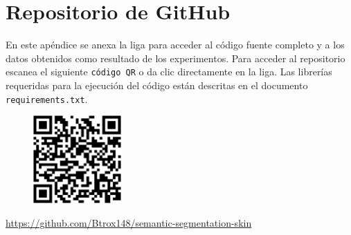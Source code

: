 \chapter{Repositorio de GitHub}

En este apéndice se anexa la liga para acceder al código fuente completo y a los datos obtenidos como resultado de los experimentos. Para acceder al repositorio escanea el siguiente \texttt{código QR} o da clic directamente en la liga. Las librerías requeridas para la ejecución del código están descritas en el documento \texttt{requirements.txt}.

\begin{figure}[h]
    \centering
    \includegraphics[width=0.3\textwidth]{repoqr.eps}
\end{figure}

\url{https://github.com/Btrox148/semantic-segmentation-skin}






